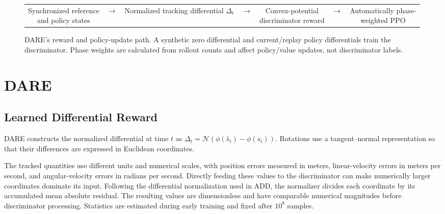 \documentclass[letterpaper,10pt,conference]{ieeeconf}
\begin{document}
\begin{figure}[t]
\centering
\setlength{\tabcolsep}{5pt}
\begin{tabular}{@{}c c c c c c c@{}}
\fbox{\parbox[c][0.52in][c]{0.17\textwidth}{\centering
Synchronized reference\\and policy states}}
& $\longrightarrow$ &
\fbox{\parbox[c][0.52in][c]{0.17\textwidth}{\centering
Normalized tracking\\differential $\Delta_t$}}
& $\longrightarrow$ &
\fbox{\parbox[c][0.52in][c]{0.17\textwidth}{\centering
Convex-potential\\discriminator reward}}
& $\longrightarrow$ &
\fbox{\parbox[c][0.52in][c]{0.17\textwidth}{\centering
Automatically phase-\\weighted PPO}}
\end{tabular}
\caption{DARE's reward and policy-update path. A synthetic zero differential
and current/replay policy differentials train the discriminator. Phase
weights are calculated from rollout counts and affect policy/value updates,
not discriminator labels.}
\label{fig:pipeline}
\end{figure}

\section{DARE}
\subsection{Learned Differential Reward}
DARE constructs the normalized differential at time $t$ as
$\Delta_t=\mathcal N\!\left(\phi(\hat s_t)-\phi(s_t)\right)$.
Rotations use a tangent--normal representation so that their differences
are expressed in Euclidean coordinates.

The tracked quantities use different units and numerical scales,
with position errors measured in meters, linear-velocity errors in meters
per second, and angular-velocity errors in radians per second. Directly
feeding these values to the discriminator can make numerically larger
coordinates dominate its input. Following the differential normalization
used in ADD, the normalizer divides each coordinate by its accumulated
mean absolute residual. The resulting values are dimensionless and have
comparable numerical magnitudes before discriminator processing. Statistics
are estimated during early training and fixed after $10^8$ samples.
\end{document}
